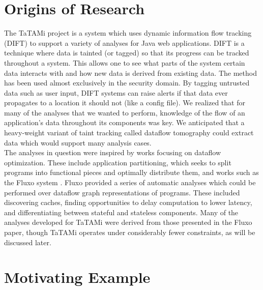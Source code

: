 \documentclass[msc,oneside]{ubcthesis}
\begin{document}
%

	
\section{Origins of Research}
		
The TaTAMi project is a system which uses dynamic information flow tracking (DIFT) to support a variety of analyses for Java web applications.  DIFT is a technique where data is tainted (or tagged) so that its progress can be tracked throughout a system. This allows one to see what parts of the system certain data interacts with and how new data is derived from existing data. The method has been used almost exclusively in the security domain. By tagging untrusted data such as user input, DIFT systems can raise alerts if that data ever propagates to a location it should not (like a config file). We realized that for many of the analyses that we wanted to perform, knowledge of the flow of an application's data throughout its components was key. We anticipated that a heavy-weight variant of taint tracking called dataflow tomography could extract data which would support many analysis cases.\\

The analyses in question were inspired by works focusing on dataflow optimization. These include application partitioning, which seeks to split programs into functional pieces and optimally distribute them, and works such as the Fluxo system \cite{Kiciman2010}. Fluxo provided a series of automatic analyses which could be performed over dataflow graph representations of programs. These included discovering caches, finding opportunities to delay computation to lower latency, and differentiating between stateful and stateless components. Many of the analyses developed for TaTAMi were derived from those presented in the Fluxo paper, though TaTAMi operates under considerably fewer constraints, as will be discussed later.	
	
\section{Motivating Example}
\end{document}
